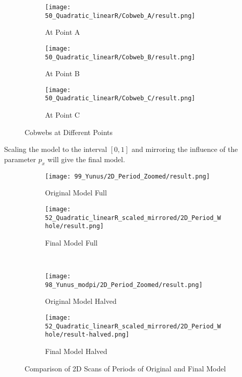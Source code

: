 \begin{figure}
    \centering
    \begin{subfigure}{0.3\textwidth}
        \centering
        \texttt{[image: 50\_Quadratic\_linearR/Cobweb\_A/result.png]}
        \caption{At Point A}
        \label{fig:quad.full.fit.lin.CobwebA}
    \end{subfigure}
    \begin{subfigure}{0.3\textwidth}
        \centering
        \texttt{[image: 50\_Quadratic\_linearR/Cobweb\_B/result.png]}
        \caption{At Point B}
        \label{fig:quad.full.fit.lin.CobwebB}
    \end{subfigure}
    \begin{subfigure}{0.3\textwidth}
        \centering
        \texttt{[image: 50\_Quadratic\_linearR/Cobweb\_C/result.png]}
        \caption{At Point C}
        \label{fig:quad.full.fit.lin.CobwebC}
    \end{subfigure}
    \caption{Cobwebs at Different Points}
    \label{fig:quad.full.fit.lin.Cobwebs}
\end{figure}

Scaling the model to the interval $[0, 1]$ and mirroring the influence of the parameter $p_x$ will give the final model.



\begin{figure}
    \centering
    \begin{subfigure}{0.4\textwidth}
        \centering
        \texttt{[image: 99\_Yunus/2D\_Period\_Zoomed/result.png]}
        \caption{Original Model Full}
        \label{fig:quad.final.comparison.og.full}
    \end{subfigure}
    \begin{subfigure}{0.4\textwidth}
        \centering
        \texttt{[image: 52\_Quadratic\_linearR\_scaled\_mirrored/2D\_Period\_Whole/result.png]}
        \caption{Final Model Full}
        \label{fig:quad.final.comparison.fin.full}
    \end{subfigure} \\
    \begin{subfigure}{0.4\textwidth}
        \centering
        \texttt{[image: 98\_Yunus\_modpi/2D\_Period\_Zoomed/result.png]}
        \caption{Original Model Halved}
        \label{fig:quad.final.comparison.og.halved}
    \end{subfigure}
    \begin{subfigure}{0.4\textwidth}
        \centering
        \texttt{[image: 52\_Quadratic\_linearR\_scaled\_mirrored/2D\_Period\_Whole/result-halved.png]}
        \caption{Final Model Halved}
        \label{fig:quad.final.comparison.fin.halved}
    \end{subfigure}
    \caption{Comparison of 2D Scans of Periods of Original and Final Model}
    \label{fig:quad.final.comparison}
\end{figure}
